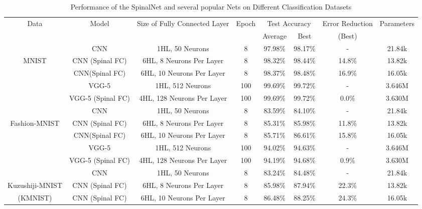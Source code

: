 \documentclass[journal]{IEEEtran}
\begin{document}
\begin{table*}
\centering
\caption{Performance of the SpinalNet and several popular Nets on Different Classification Datasets}
\label{Perform_tab}
\begin{tabular}{|c|c|c|c|c|c|c|c|}
\hline
 Data  & Model & Size of Fully Connected Layer & Epoch & \multicolumn{2}{|c|}{Test Accuracy} & Error Reduction & Parameters  \\ \cline{5-6}
 &&&&Average&Best&(Best)&
 \\\hline 

      & CNN\cite{MNIST_CNN}& 1HL, 50 Neurons &8 & 97.98\% &98.17\%&- & 21.84k \\ \cline{2-8}
 MNIST  & CNN (Spinal FC) & 6HL, 8 Neurons Per Layer &8 &98.32\%&98.44\%  & 14.8\% &13.82k\\ \cline{2-8}
 \cite{deng2012mnist} & CNN(Spinal FC) & 6HL, 10 Neurons Per Layer &8 &98.37\%&98.48\% &16.9\%&16.05k\\ \cline{2-8}
      
      & VGG-5\cite{VGG5} & 1HL, 512 Neurons &100&99.69\%&99.72\% &- &3.646M\\ \cline{2-8}
      & VGG-5 (Spinal FC) & 4HL, 128 Neurons Per Layer &100&99.69\%&99.72\% &0.0\% &3.630M\\ \hline \hline 
      
        & CNN\cite{MNIST_CNN}& 1HL, 50 Neurons &8 &83.59\%&84.10\%&-& 21.84k \\ \cline{2-8}
 Fashion-MNIST  & CNN (Spinal FC) & 6HL, 8 Neurons Per Layer  &8 &85.31\%&85.98\%  & 11.8\%&13.82k\\ \cline{2-8}
  \cite{xiao2017fashion}    & CNN(Spinal FC) & 6HL, 10 Neurons Per Layer &8 &85.71\%&86.61\% &15.8\%&16.05k\\ \cline{2-8}
     
      & VGG-5\cite{VGG5} & 1HL, 512 Neurons &100&94.02\%&94.63\% &- &3.646M\\ \cline{2-8}
      & VGG-5 (Spinal FC) & 4HL, 128 Neurons Per Layer &100&94.19\%&94.68\% &0.9\% &3.630M\\ \hline  \hline 
      
        & CNN\cite{MNIST_CNN}& 1HL, 50 Neurons &8 &83.24\%&84.48\%&- & 21.84k\\ \cline{2-8}
 Kuzushiji-MNIST  & CNN (Spinal FC) & 6HL, 8 Neurons Per Layer &8 &85.98\%&87.94\%  & 22.3\%&13.82k\\ \cline{2-8}
     (KMNIST) \cite{clanuwat2018deep} & CNN (Spinal FC) & 6HL, 10 Neurons Per Layer &8 &86.48\%&88.25\% &24.3\%&16.05k\\ \cline{2-8}
      

\end{tabular}
\end{table*}
\end{document}
